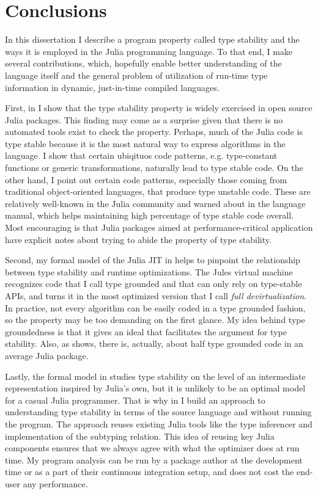 \chapter{Conclusions}%
\label{chap:conc}

In this dissertation I describe a program property called type stability and the
ways it is employed in the Julia programming language. To that end, I make
several contributions, which, hopefully enable better understanding of the
language itself and the general problem of utilization of run-time type
information in dynamic, just-in-time compiled languages.

First, in  I show that the type stability property is
widely exercised in open source Julia packages. This finding may come as a
surprise given that there is no automated tools exist to check the property.
Perhaps, much of the Julia code is type stable because it is the most natural
way to express algorithms in the language. I show that certain ubiqituos code
patterns, e.g. type-constant functions or generic transformations, naturally
lead to type stable code. On the other hand, I point out certain code
patterns, especially those coming from traditional object-oriented languages,
that produce type unstable code. These are relatively well-known in the Julia
community and warned about in the language manual, which helps maintaining high
percentage of type stable code overall. Most encouraging is that Julia packages
aimed at performance-critical application have explicit notes about trying to
abide the property of type stability.

Second, my formal model of the Julia JIT in  helps to
pinpoint the relationship between type stability and runtime optimizations. The
Jules virtual machine recognizes code that I call type grounded and that can
only rely on type-stable APIs, and turns it in the most optimized version that I
call \emph{full devirtualization}. In practice, not every algorithm can be
easily coded in a type grounded fashion, so the property may be too demanding on
the first glance. My idea behind type groundedness is that it gives an ideal
that facilitates the argument for type stability. Also, as
 shows, there is, actually, about half type grounded
code in an average Julia package.

Lastly, the formal model in  studies type stability on the
level of an intermediate representation inspired by Julia's own, but it is
unlikely to be an optimal model for a casual Julia programmer. That is why in
 I build an approach to understanding type stability in
terms of the source language and without running the program. The approach
reuses existing Julia tools like the type inferencer and implementation of
the subtyping relation. This idea of reusing key Julia components ensures that
we always agree with what the optimizer does at run time. My program analysis
can be run by a package author at the development time or as a part of their
continuous integration setup, and does not cost the end-user any performance.

